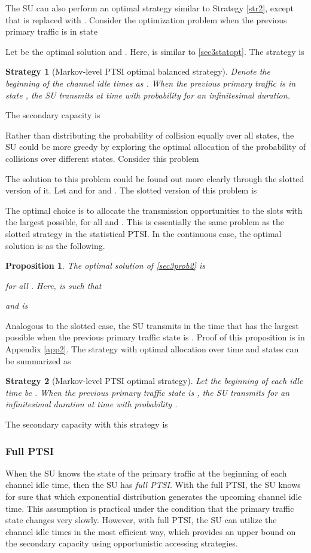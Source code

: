\documentclass[10pt,final,journal,letterpaper]{IEEEtran}
\newtheorem{proposition}{Proposition}
\newtheorem{strategy}{Strategy}
\begin{document}
\par
The SU can also perform an optimal strategy similar to Strategy \ref{str2}, except that  is replaced with . Consider the optimization problem when the previous primary traffic is in state 

Let  be the optimal solution and . Here,  is similar to \eqref{sec3statopt}. The strategy is
\begin{strategy}[Markov-level PTSI optimal balanced strategy]
Denote the beginning of the channel idle times as . When the previous primary traffic is in state , the SU transmits at time  with probability  for an infinitesimal duration.
\end{strategy}
The secondary capacity is


\par
Rather than distributing the probability of collision equally over all states, the SU could be more greedy by exploring the optimal allocation of the probability of collisions over different states. Consider this problem

The solution to this problem could be found out more clearly through the slotted version of it. Let  and  for  and . The slotted version of this problem is

The optimal choice is to allocate the transmission opportunities  to the slots with the largest  possible, for all  and . This is essentially the same problem as the slotted strategy in the statistical PTSI. In the continuous case, the optimal solution is as the following.
\begin{proposition}\label{sec3prop1}
The optimal solution of \eqref{sec3prob2} is

for all . Here,  is such that

and  is

\end{proposition}
Analogous to the slotted case, the SU transmits in the time that has the largest  possible when the previous primary traffic state is . Proof of this proposition is in Appendix \ref{app2}. The strategy with optimal allocation over time and states can be summarized as
\begin{strategy}[Markov-level PTSI optimal strategy]
Let the beginning of each idle time be . When the previous primary traffic state is , the SU transmits for an infinitesimal duration at time  with probability .
\end{strategy}
The secondary capacity with this strategy is


\subsubsection{Full PTSI}
When the SU knows the state of the primary traffic at the beginning of each channel idle time, then the SU has \emph{full PTSI}. With the full PTSI, the SU knows for sure that which exponential distribution generates the upcoming channel idle time. This assumption is practical under the condition that the primary traffic state changes very slowly. However, with full PTSI, the SU can utilize the channel idle times in the most efficient way, which provides an upper bound on the secondary capacity using opportunistic accessing strategies.
\end{document}
